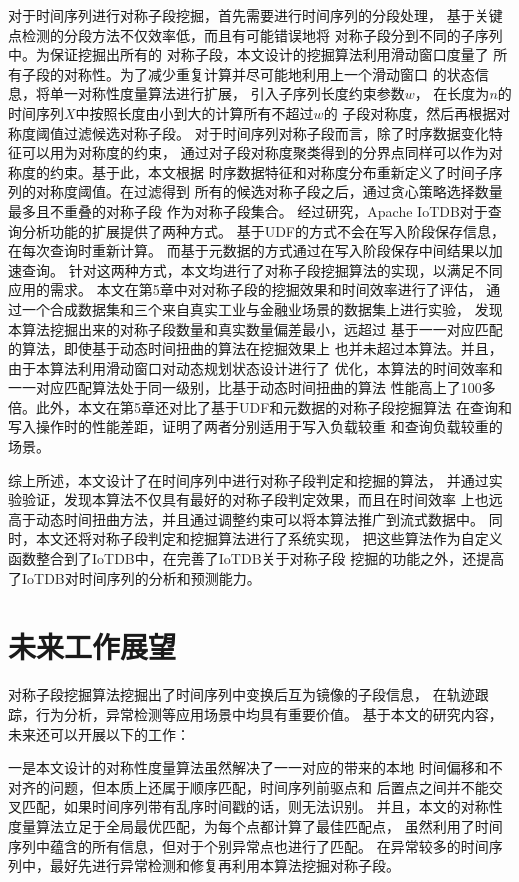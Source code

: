 对于时间序列进行对称子段挖掘，首先需要进行时间序列的分段处理，
基于关键点检测的分段方法不仅效率低，而且有可能错误地将
对称子段分到不同的子序列中。为保证挖掘出所有的
对称子段，本文设计的挖掘算法利用滑动窗口度量了
所有子段的对称性。为了减少重复计算并尽可能地利用上一个滑动窗口
的状态信息，将单一对称性度量算法进行扩展，
引入子序列长度约束参数$w$，
在长度为$n$的时间序列$X$中按照长度由小到大的计算所有不超过$w$的
子段对称度，然后再根据对称度阈值过滤候选对称子段。
对于时间序列对称子段而言，除了时序数据变化特征可以用为对称度的约束，
通过对子段对称度聚类得到的分界点同样可以作为对称度的约束。基于此，本文根据
时序数据特征和对称度分布重新定义了时间子序列的对称度阈值。在过滤得到
所有的候选对称子段之后，通过贪心策略选择数量最多且不重叠的对称子段
作为对称子段集合。
经过研究，Apache IoTDB对于查询分析功能的扩展提供了两种方式。
基于UDF的方式不会在写入阶段保存信息，在每次查询时重新计算。
而基于元数据的方式通过在写入阶段保存中间结果以加速查询。
针对这两种方式，本文均进行了对称子段挖掘算法的实现，以满足不同应用的需求。
本文在第5章中对对称子段的挖掘效果和时间效率进行了评估，
通过一个合成数据集和三个来自真实工业与金融业场景的数据集上进行实验，
发现本算法挖掘出来的对称子段数量和真实数量偏差最小，远超过
基于一一对应匹配的算法，即使基于动态时间扭曲的算法在挖掘效果上
也并未超过本算法。并且，由于本算法利用滑动窗口对动态规划状态设计进行了
优化，本算法的时间效率和一一对应匹配算法处于同一级别，比基于动态时间扭曲的算法
性能高上了100多倍。此外，本文在第5章还对比了基于UDF和元数据的对称子段挖掘算法
在查询和写入操作时的性能差距，证明了两者分别适用于写入负载较重
和查询负载较重的场景。


综上所述，本文设计了在时间序列中进行对称子段判定和挖掘的算法，
并通过实验验证，发现本算法不仅具有最好的对称子段判定效果，而且在时间效率
上也远高于动态时间扭曲方法，并且通过调整约束可以将本算法推广到流式数据中。
同时，本文还将对称子段判定和挖掘算法进行了系统实现，
把这些算法作为自定义函数整合到了IoTDB中，在完善了IoTDB关于对称子段
挖掘的功能之外，还提高了IoTDB对时间序列的分析和预测能力。

\section{未来工作展望}
对称子段挖掘算法挖掘出了时间序列中变换后互为镜像的子段信息，
在轨迹跟踪，行为分析，异常检测等应用场景中均具有重要价值。
基于本文的研究内容，未来还可以开展以下的工作：

一是本文设计的对称性度量算法虽然解决了一一对应的带来的本地
时间偏移和不对齐的问题，但本质上还属于顺序匹配，时间序列前驱点和
后置点之间并不能交叉匹配，如果时间序列带有乱序时间戳的话，则无法识别。
并且，本文的对称性度量算法立足于全局最优匹配，为每个点都计算了最佳匹配点，
虽然利用了时间序列中蕴含的所有信息，但对于个别异常点也进行了匹配。
在异常较多的时间序列中，最好先进行异常检测和修复再利用本算法挖掘对称子段。

